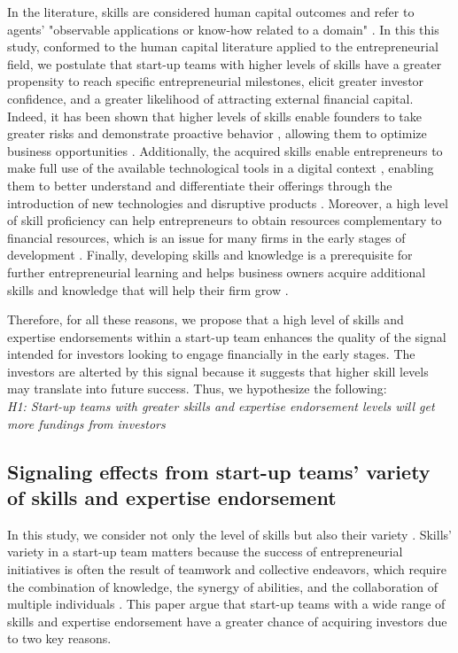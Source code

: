 \documentclass[12pt]{article}
\begin{document}
In the literature, skills are considered human capital outcomes and refer to agents’ "observable applications or know-how related to a domain" \citep{becker1964human, marvel2016human}. In this this study, conformed to the human capital literature applied to the entrepreneurial field, we postulate that start-up teams with higher levels of skills have a greater propensity to reach specific entrepreneurial milestones, elicit greater investor confidence, and a greater likelihood of attracting external financial capital. Indeed, it has been shown that higher levels of skills enable founders to take greater risks and demonstrate proactive behavior \citep{becherer1999proactive}, allowing them to optimize business opportunities \citep{shane2000promise, chandler1994founder}. Additionally, the acquired skills enable entrepreneurs to make full use of the available technological tools in a digital context \citep{nambisan2017digital}, enabling them to better understand and differentiate their offerings through the introduction of new technologies and disruptive products \citep{marvel2007technology}. Moreover, a high level of skill proficiency can help entrepreneurs to obtain resources complementary to financial resources, which is an issue for many firms in the early stages of development \citep{beckman2007early, zarutskie2010role}. Finally, developing skills and knowledge is a prerequisite for further entrepreneurial learning and helps business owners acquire additional skills and knowledge that will help their firm grow \citep{hunter1986cognitive}.

Therefore, for all these reasons, we propose that a high level of skills and expertise endorsements within a start-up team enhances the quality of the signal intended for investors looking to engage financially in the early stages. The investors are alterted by this signal because it suggests that higher skill levels may translate into future success. Thus, we hypothesize the following: \\

\noindent \textit{H1: Start-up teams with greater skills and expertise endorsement levels will get more fundings from investors}

\subsection{Signaling effects from start-up teams' variety of skills and expertise endorsement}

In this study, we consider not only the level of skills but also their variety \citep{harrison2007s, grillitsch2021does}. Skills' variety in a start-up team matters because the success of entrepreneurial initiatives is often the result of teamwork and collective endeavors, which require the combination of knowledge, the synergy of abilities, and the collaboration of multiple individuals \citep{klotz2014new}. This paper argue that start-up teams with a wide range of skills and expertise endorsement have a greater chance of acquiring investors due to two key reasons.
\end{document}
